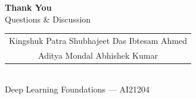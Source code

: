 \documentclass[aspectratio=169, 10pt]{beamer}
\begin{document}
\begin{frame}[plain]
  \begin{center}
    \vspace{1.5cm}
    {\Huge \textbf{Thank You}}\\[1em]
    {\large Questions \& Discussion}\\[2em]
    \begin{tabular}{c}
      Kingshuk Patra \quad Shubhajeet Das \quad Ibtesam Ahmed \\[0.3em]
      Aditya Mondal \quad Abhishek Kumar
    \end{tabular}\\[1.5em]
    {\small Deep Learning Foundations --- AI21204}
  \end{center}
\end{frame}
\end{document}
